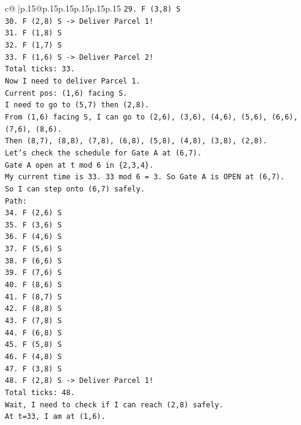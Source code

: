 \documentclass{article}
\begin{document}
{\begin{supertabular}{c@{$\;$}|p{.15\linewidth}@{}p{.15\linewidth}p{.15\linewidth}p{.15\linewidth}p{.15\linewidth}p{.15\linewidth}}
{{{\texttt{29. F (3,8) S} \\
\texttt{30. F (2,8) S {-}> Deliver Parcel 1!} \\
\texttt{31. F (1,8) S} \\
\texttt{32. F (1,7) S} \\
\texttt{33. F (1,6) S {-}> Deliver Parcel 2!} \\
\texttt{Total ticks: 33.} \\
\texttt{Now I need to deliver Parcel 1.} \\
\texttt{Current pos: (1,6) facing S.} \\
\texttt{I need to go to (5,7) then (2,8).} \\
\texttt{From (1,6) facing S, I can go to (2,6), (3,6), (4,6), (5,6), (6,6), (7,6), (8,6).} \\
\texttt{Then (8,7), (8,8), (7,8), (6,8), (5,8), (4,8), (3,8), (2,8).} \\
\texttt{Let's check the schedule for Gate A at (6,7).} \\
\texttt{Gate A open at t mod 6 in \{2,3,4\}.} \\
\texttt{My current time is 33. 33 mod 6 = 3. So Gate A is OPEN at (6,7).} \\
\texttt{So I can step onto (6,7) safely.} \\
\texttt{Path:} \\
\texttt{34. F (2,6) S} \\
\texttt{35. F (3,6) S} \\
\texttt{36. F (4,6) S} \\
\texttt{37. F (5,6) S} \\
\texttt{38. F (6,6) S} \\
\texttt{39. F (7,6) S} \\
\texttt{40. F (8,6) S} \\
\texttt{41. F (8,7) S} \\
\texttt{42. F (8,8) S} \\
\texttt{43. F (7,8) S} \\
\texttt{44. F (6,8) S} \\
\texttt{45. F (5,8) S} \\
\texttt{46. F (4,8) S} \\
\texttt{47. F (3,8) S} \\
\texttt{48. F (2,8) S {-}> Deliver Parcel 1!} \\
\texttt{Total ticks: 48.} \\
\texttt{Wait, I need to check if I can reach (2,8) safely.} \\
\texttt{At t=33, I am at (1,6).} \\
}}}
\end{supertabular}}
\end{document}
